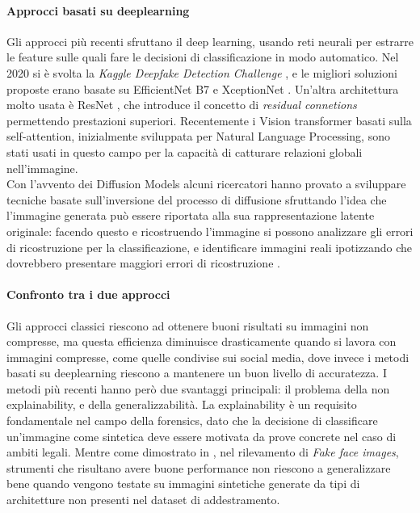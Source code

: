 \paragraph{Approcci basati su deeplearning} Gli approcci più recenti sfruttano il deep learning, usando reti neurali per estrarre le feature sulle quali fare le decisioni di classificazione in modo automatico.
Nel 2020 si è svolta la \textit{Kaggle Deepfake Detection Challenge} \cite{dolhansky2020deepfakedetectionchallengedfdc} , e le migliori soluzioni proposte erano basate su EfficientNet B7 \cite{pmlr-v97-tan19a} e XceptionNet \cite{8099678}.
Un'altra architettura molto usata è ResNet \cite{7780459}, che introduce il concetto di \textit{residual connetions} permettendo prestazioni superiori.
Recentemente i Vision transformer basati sulla self-attention, inizialmente  sviluppata per Natural Language Processing, sono stati usati in questo campo per la capacità di catturare relazioni globali nell'immagine.\\
Con l'avvento dei Diffusion Models alcuni ricercatori hanno provato a sviluppare tecniche basate sull'inversione del processo di diffusione sfruttando l'idea che l'immagine generata può essere riportata alla sua rappresentazione latente originale: facendo questo e ricostruendo l'immagine si possono analizzare gli errori di ricostruzione per la classificazione, e identificare immagini reali ipotizzando che dovrebbero presentare maggiori errori di ricostruzione \cite{wang2023dire}. 
\paragraph{Confronto tra i due approcci}
Gli approcci classici riescono ad ottenere buoni risultati su immagini non compresse, ma questa efficienza diminuisce drasticamente quando si lavora con immagini compresse, come quelle condivise sui social media, dove invece i metodi basati su deeplearning riescono a mantenere un buon livello di accuratezza. 
I metodi più recenti hanno però due svantaggi principali: il problema della non explainability, e della generalizzabilità.
La explainability è un requisito fondamentale nel campo della forensics, dato che la decisione di classificare un'immagine come sintetica deve essere motivata da prove concrete nel caso di ambiti legali.
Mentre come dimostrato in \cite{khodabakhsh2018fake}, nel rilevamento di \textit{Fake face images}, strumenti che risultano avere buone performance non riescono a generalizzare bene quando vengono testate su immagini sintetiche generate da tipi di architetture non presenti nel dataset di addestramento.
\newpage
